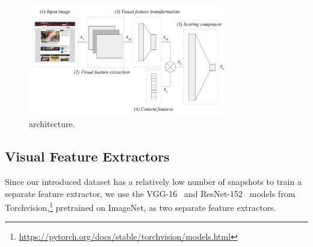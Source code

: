

\begin{figure}[t]
\includegraphics[width = 3.4in]{images/multimodelarchitecture.pdf}
\caption{\datasetname{} architecture.}
\label{fig:multimodelarchitecture}
\end{figure}

\subsection{Visual Feature Extractors} \label{sec:visualfeatures}
Since our introduced \datasetname{} data\-set has a relatively low number of snapshots to train a separate feature extractor, we use the VGG-16~\cite{simonyan2014very} and ResNet-152~\cite{he2016deep} models from Torchvision,\footnote{\url{https://pytorch.org/docs/stable/torchvision/models.html}} pretrained on ImageNet, as two separate feature extractors.

